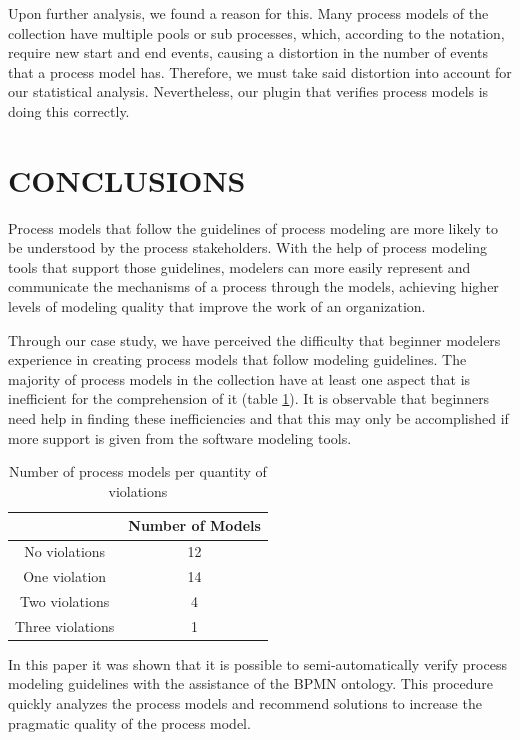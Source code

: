 \documentclass[a4paper,twoside]{article}
\begin{document}
Upon further analysis, we found a reason for this. Many process models of the collection have multiple pools or sub processes, which, according to the notation, require new start and end events, causing a distortion in the number of events that a process model has. Therefore, we must take said distortion into account for our statistical analysis. Nevertheless, our plugin that verifies process models is doing this correctly.





\section{CONCLUSIONS}\label{Conclusion}

\noindent Process models that follow the guidelines of process modeling are more likely to be understood by the process stakeholders. With the help of process modeling tools that support those guidelines, modelers can more easily represent and communicate the mechanisms of a process through the models, achieving higher levels of modeling quality that improve the work of an organization.

Through our case study, we have perceived the difficulty that beginner modelers experience in creating process models that follow modeling guidelines. The majority of process models in the collection have at least one aspect that is inefficient for the comprehension of it (table \ref{ModelsPerQuantityOfViolation}). It is observable that beginners need help in finding these inefficiencies and that this may only be accomplished if more support is given from the software modeling tools.

\begin{table}[]
	\centering
	\caption{Number of process models per quantity of violations}
	\label{ModelsPerQuantityOfViolation}
	\begin{tabular}{|c|c|}
		\hline
		& Number of Models \\ \hline
		No violations & 12 \\ \hline
		One violation & 14 \\ \hline
		Two violations & 4 \\ \hline
		Three violations & 1 \\ \hline
	\end{tabular}
\end{table}

In this paper it was shown that it is possible to semi-automatically verify process modeling guidelines with the assistance of the BPMN ontology. This procedure quickly analyzes the process models and recommend solutions to increase the pragmatic quality of the process model. %
\end{document}
